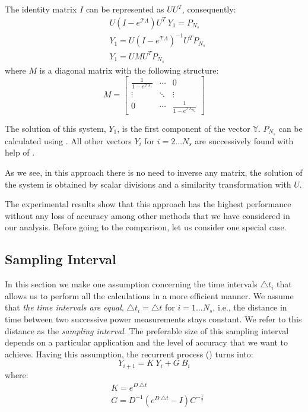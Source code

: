 The identity matrix $I$ can be represented as $U U^T$, consequently:
\begin{align*}
  & U (I - e^{\mathcal{T} \Lambda}) U^T \: Y_1 = P_{N_s} \\
  & Y_1 = U (I - e^{\mathcal{T} \Lambda})^{-1} U^T P_{N_s} \\
  & Y_1 = U M U^T P_{N_s}
\end{align*}
where $M$ is a diagonal matrix with the following structure:
\[
  M = \left[
    \begin{array}{ccc}
      \frac{1}{1 - e^{\mathcal{T} \lambda_1}} & \cdots & 0 \\
      \vdots & \ddots & \vdots \\
      0 & \cdots & \frac{1}{1 - e^{\mathcal{T} \lambda_{N_n}}}
    \end{array}
  \right]
\]

The solution of this system, $Y_1$, is the first component of the vector $\mathbb{Y}$. $P_{N_s}$ can be calculated using . All other vectors $Y_i$ for $i = 2 \dots N_s$ are successively found with help of .

As we see, in this approach there is no need to inverse any matrix, the solution of the system is obtained by scalar divisions and a similarity transformation with $U$.

The experimental results show that this approach has the highest performance without any loss of accuracy among other methods that we have considered in our analysis. Before going to the comparison, let us consider one special case.

\subsection{Sampling Interval}
In this section we make one assumption concerning the time intervals $\triangle t_i$ that allows us to perform all the calculations in a more efficient manner. We assume that \emph{the time intervals are equal}, $\triangle t_i = \triangle t$ for $i = 1 \dots N_s$, i.e., the distance in time between two successive power measurements stays constant. We refer to this distance as the \emph{sampling interval}. The preferable size of this sampling interval depends on a particular application and the level of accuracy that we want to achieve. Having this assumption, the recurrent process () turns into:
\[
  Y_{i+1} = K \: Y_i + G \: B_i
\]
where:
\begin{align*}
  & K = e^{D \: \triangle t} \\
  & G = D^{-1} \left( e^{D \: \triangle t} - I \right) C^{-\frac{1}{2}}
\end{align*}

